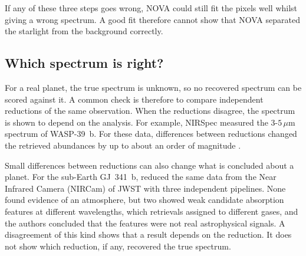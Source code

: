 If any of these three steps goes wrong, NOVA could still fit the pixels well
whilst giving a wrong spectrum. A good fit therefore cannot show that NOVA
separated the starlight from the background correctly. 

\subsection{Which spectrum is right?}
\label{sec:validation-problem}

For a real planet, the true spectrum is unknown, so no recovered spectrum can
be scored against it. A common check is therefore to compare independent
reductions of the same observation. When the reductions disagree, the
spectrum is shown to depend on the analysis. For example, NIRSpec measured the $3$-$5\,\mu\mathrm{m}$ spectrum of
WASP-39~b. For these data, differences between reductions changed the
retrieved abundances by up to about an order of magnitude
\citep{ConstantinouEtAl2023}.

Small differences between reductions can also change what is concluded about
a planet. For the sub-Earth GJ~341~b, \citet{KirkEtAl2024} reduced the same data from the Near Infrared Camera (NIRCam) of JWST with three
independent pipelines. None found evidence of an atmosphere, but two showed
weak candidate absorption features at different wavelengths, which retrievals
assigned to different gases, and the authors concluded that the features were not real astrophysical signals. A
disagreement of this kind shows that a result depends on the reduction. It
does not show which reduction, if any, recovered the true spectrum.


